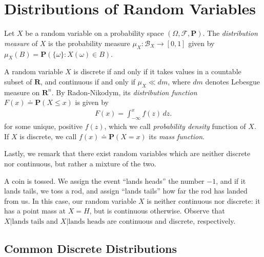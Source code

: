 \section{Distributions of Random Variables}
\begin{definition}
	Let $X$ be a random variable on a probability space $(\Omega, \mathcal{F}, 
	\mathbf{P})$. 
	The \emph{distribution measure} of $X$ is the probability measure $\mu_X:
	\mathcal{B}_X \to [0,1]$ given by $\mu_X(B) = \mathbf{P}(\{\omega\}: X(\omega) \in 
	B)$.
\end{definition}
\begin{definition}
	A random variable $X$ is discrete if and only if it takes values in a 
	countable
	subset of $\mathbf{R}$, and continuous if and only if $\mu_X \ll dm$, where $dm$
	denotes Lebesgue measure on $\mathbf{R}^n$. By Radon-Nikodym, its 
	\emph{distribution
	function} $F(x) \doteq \mathbf{P}(X \le x)$ is given by
	\begin{align*}
		F(x) = \int_{-\infty}^x f(z) \,dz.
	\end{align*}
	for some unique, positive $f(z)$, which we call \emph{probability density}
	function of $X$.
	If $X$ is discrete, we call
	$f(x) \doteq \mathbf{P}(X = x)$ its \emph{mass function}.
\end{definition}
Lastly, we remark that there exist random variables which are neither
discrete nor continuous, but rather a mixture of the two.
\begin{example}
	A coin is tossed. We assign the event ``lands heads'' the number $-1$, and 
	if it lands tails, we toss a rod, and assign ``lands tails'' how far the 
	rod has
	landed from us. In this case, our random variable $X$ is neither continuous 
	nor
	discrete: it has a point mass at $X = H$, but is continuous otherwise.
	Observe that $X | \text{lands tails}$ and $X | \text{lands heads}$ are
	continuous and discrete, respectively.
\end{example}
\subsection{Common Discrete Distributions}
